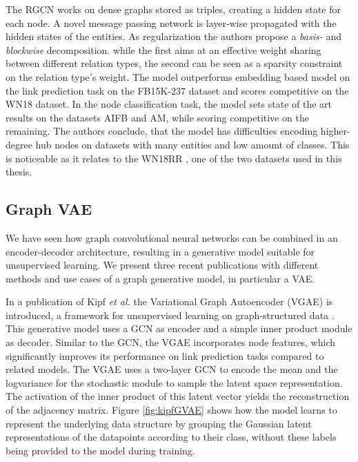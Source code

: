 The RGCN works on dense graphs stored as triples, creating a hidden state for each node. A novel message passing network is layer-wise propagated with the hidden states of the entities. As regularization the authors propose a \textit{basis-} and \textit{blockwise} decomposition. while the first  aims at an effective weight sharing between different relation types, the second  can be seen as a sparsity constraint on the relation type's weight. The model outperforms embedding based model on the link prediction task on the FB15K-237 dataset and scores competitive on the WN18 dataset. In the node classification task, the model sets state of the art results on the datasets AIFB and AM, while scoring competitive on the remaining. The authors conclude, that the model has difficulties encoding higher-degree hub nodes on datasets with many entities and low amount of classes. This is noticeable as it relates to the WN18RR \cite{battaglia_relational_2018}, one of the two datasets used in this thesis.  


\subsection{Graph VAE}
We have seen how graph convolutional neural networks can be combined in an encoder-decoder architecture, resulting in a generative model suitable for unsupervised learning. We present three recent publications with different methods and use cases of a graph generative model, in particular a VAE.

In a publication of Kipf \textit{et al.} the Variational Graph Autoencoder (VGAE) is introduced, a framework for unsupervised learning on graph-structured data \cite{kipf_variational_2016}. This generative model uses a GCN as encoder and a simple inner product module as decoder. Similar to the GCN, the VGAE incorporates node features, which significantly improves its performance on link prediction tasks compared to related models. The VGAE uses a two-layer GCN to encode the mean and the logvariance for the stochastic module to sample the latent space representation. The activation of the inner product of this latent vector yields the reconstruction of the adjacency matrix. Figure \ref{fig:kipfGVAE} shows how the model learns to represent the underlying data structure by grouping the Gaussian latent representations of the datapoints according to their class, without these labels being provided to the model during training.

